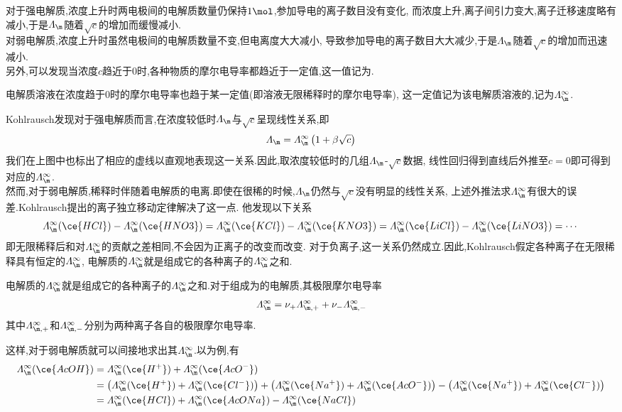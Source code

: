 \documentclass{ctexart}
\begin{document}
\indent 对于强电解质,浓度上升时两电极间的电解质数量仍保持$1\mol$,参加导电的离子数目没有变化,%
而浓度上升,离子间引力变大,离子迁移速度略有减小,于是$\varLambda_\m$随着$\sqrt{c}$的增加而缓慢减小.\\
\indent 对弱电解质,浓度上升时虽然电极间的电解质数量不变,但电离度大大减小,
导致参加导电的离子数目大大减少,于是$\varLambda_\m$随着$\sqrt{c}$的增加而迅速减小.\\
\indent 另外,可以发现当浓度$c$趋近于$0$时,各种物质的摩尔电导率都趋近于一定值,这一值记为.
\begin{definition}[6A.1.4 极限摩尔电导率]
    电解质溶液在浓度趋于$0$时的摩尔电导率也趋于某一定值(即溶液无限稀释时的摩尔电导率),%
    这一定值记为该电解质溶液的,记为$\varLambda_\m^\infty$.
\end{definition}
Kohlrausch发现对于强电解质而言,在浓度较低时$\varLambda_\m$与$\sqrt{c}$呈现线性关系,即
\[\varLambda_\m=\varLambda_\m^\infty\left(1+\beta\sqrt{c}\right)\]
我们在上图中也标出了相应的虚线以直观地表现这一关系.因此,取浓度较低时的几组$\varLambda_\m$-$\sqrt{c}$数据,%
线性回归得到直线后外推至$c=0$即可得到对应的$\varLambda_\m^\infty$.\\
\indent 然而,对于弱电解质,稀释时伴随着电解质的电离.即使在很稀的时候,$\varLambda_\m$仍然与$\sqrt{c}$没有明显的线性关系,%
上述外推法求$\varLambda_\m^\infty$有很大的误差.Kohlrausch提出的离子独立移动定律解决了这一点.%
他发现以下关系
\[\varLambda_\m^\infty(\ce{HCl})-\varLambda_\m^\infty(\ce{HNO3})
=\varLambda_\m^\infty(\ce{KCl})-\varLambda_\m^\infty(\ce{KNO3})
=\varLambda_\m^\infty(\ce{LiCl})-\varLambda_\m^\infty(\ce{LiNO3})=\cdots\]
即无限稀释后和对$\varLambda_\m^\infty$的贡献之差相同,不会因为正离子的改变而改变.%
对于负离子,这一关系仍然成立.因此,Kohlrausch假定各种离子在无限稀释具有恒定的$\varLambda_\m^\infty$,%
电解质的$\varLambda_\m^\infty$就是组成它的各种离子的$\varLambda_\m^\infty$之和.
\begin{theorem}[6A.1.5 离子独立移动定律]
    电解质的$\varLambda_\m^\infty$就是组成它的各种离子的$\varLambda_\m^\infty$之和.对于组成为的电解质,其极限摩尔电导率
    \[\varLambda_\m^\infty=\nu_+\varLambda_{\m,+}^\infty+\nu_-\varLambda_{\m,-}^\infty\]
    其中$\varLambda_{\m,+}^\infty$和$\varLambda_{\m,-}^\infty$分别为两种离子各自的极限摩尔电导率.
\end{theorem}
这样,对于弱电解质就可以间接地求出其$\varLambda_\m^\infty$.以为例,有
\[\begin{aligned}
    \varLambda_\m^\infty(\ce{AcOH})
    &= \varLambda_\m^\infty(\ce{H^+})+\varLambda_\m^\infty(\ce{AcO^-}) \\
    &= \left(\varLambda_\m^\infty(\ce{H^+})+\varLambda_\m^\infty(\ce{Cl^-})\right)
        +\left(\varLambda_\m^\infty(\ce{Na^+})+\varLambda_\m^\infty(\ce{AcO^-})\right)
        -\left(\varLambda_\m^\infty(\ce{Na^+})+\varLambda_\m^\infty(\ce{Cl^-})\right) \\
    &= \varLambda_\m^\infty(\ce{HCl})+\varLambda_\m^\infty(\ce{AcONa})-\varLambda_\m^\infty(\ce{NaCl})
\end{aligned}\]
\end{document}

